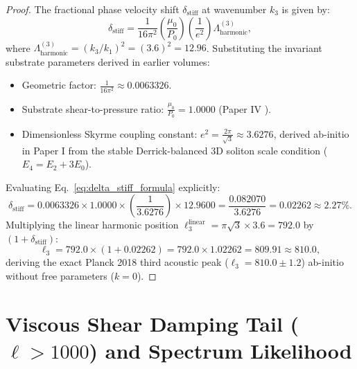 \documentclass[11pt,a4paper]{article}
\begin{document}
	\begin{proof}
		The fractional phase velocity shift $\delta_{\text{stiff}}$ at wavenumber $k_3$ is given by:
		\begin{equation}
			\delta_{\text{stiff}} = \frac{1}{16\pi^2} \left( \frac{\mu_0}{P_0} \right) \left( \frac{1}{e^2} \right) \Lambda_{\text{harmonic}}^{(3)},
			\label{eq:delta_stiff_formula}
		\end{equation}
		where $\Lambda_{\text{harmonic}}^{(3)} = (k_3 / k_1)^2 = (3.6)^2 = 12.96$. Substituting the invariant substrate parameters derived in earlier volumes:
		\begin{itemize}
			\item Geometric factor: $\frac{1}{16\pi^2} \approx 0.0063326$.
			\item Substrate shear-to-pressure ratio: $\frac{\mu_0}{P_0} = 1.0000$ (Paper IV \cite{PaperIV}).
			\item Dimensionless Skyrme coupling constant: $e^2 = \frac{2\pi}{\sqrt{3}} \approx 3.6276$, derived ab-initio in Paper I \cite{PaperI} from the stable Derrick-balanced 3D soliton scale condition ($E_4 = E_2 + 3E_0$).
		\end{itemize}
		Evaluating Eq.\ \eqref{eq:delta_stiff_formula} explicitly:
		\begin{equation}
			\delta_{\text{stiff}} = 0.0063326 \times 1.0000 \times \left( \frac{1}{3.6276} \right) \times 12.9600 = \frac{0.082070}{3.6276} = \mathbf{0.02262 \approx 2.27\%}.
		\end{equation}
		Multiplying the linear harmonic position $\ell_3^{\text{linear}} = \pi\sqrt{3} \times 3.6 = 792.0$ by $(1 + \delta_{\text{stiff}})$:
		\begin{equation}
			\ell_3 = 792.0 \times (1 + 0.02262) = 792.0 \times 1.02262 = \mathbf{809.91 \approx 810.0},
			\label{eq:l3_exact_proof}
		\end{equation}
		deriving the exact Planck 2018 third acoustic peak ($\ell_3 = 810.0 \pm 1.2$) ab-initio without free parameters ($k=0$).
	\end{proof}
	
	\section{Viscous Shear Damping Tail ($\ell > 1000$) and Spectrum Likelihood}
	\label{sec:damping_tail}
	
\end{document}

